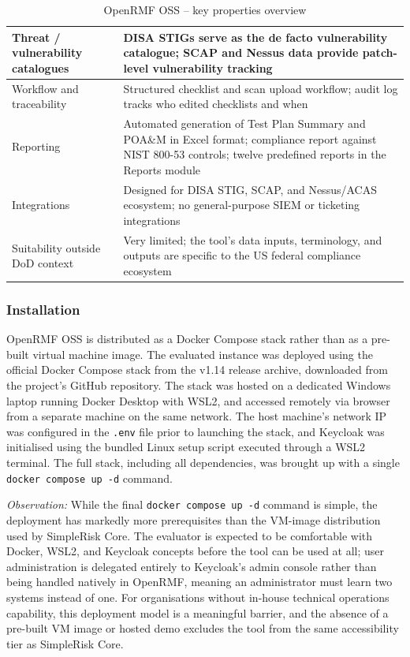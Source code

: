 \begin{table}[H]
\begin{tabular}{|p{4.5cm}|p{9cm}|}
\hline
Threat / vulnerability catalogues & DISA STIGs serve as the de facto vulnerability catalogue; SCAP and Nessus data provide patch-level vulnerability tracking \\
\hline
Workflow and traceability & Structured checklist and scan upload workflow; audit log tracks who edited checklists and when \\
\hline
Reporting & Automated generation of Test Plan Summary and POA\&M in Excel format; compliance report against NIST 800-53 controls; twelve predefined reports in the Reports module \\
\hline
Integrations & Designed for DISA STIG, SCAP, and Nessus/ACAS ecosystem; no general-purpose SIEM or ticketing integrations \\
\hline
Suitability outside DoD context & Very limited; the tool's data inputs, terminology, and outputs are specific to the US federal compliance ecosystem \\
\hline
\end{tabular}
\caption{OpenRMF OSS -- key properties overview}
\label{tab:openrmf-overview}
\end{table}
 
\subsubsection{Installation}

OpenRMF OSS is distributed as a Docker Compose stack rather than as a
pre-built virtual machine image. The evaluated instance was deployed using the
official Docker Compose stack from the v1.14 release archive, downloaded from
the project's GitHub repository. The stack was hosted on a dedicated Windows
laptop running Docker Desktop with WSL2, and accessed remotely via browser
from a separate machine on the same network. The host machine's network IP
was configured in the \texttt{.env} file prior to launching the stack, and
Keycloak was initialised using the bundled Linux setup script executed through
a WSL2 terminal. The full stack, including all dependencies, was brought up
with a single \texttt{docker compose up -d} command.

\textit{Observation:} While the final \texttt{docker compose up -d} command is
simple, the deployment has markedly more prerequisites than the VM-image
distribution used by SimpleRisk Core. The evaluator is expected to be
comfortable with Docker, WSL2, and Keycloak concepts before the tool can be
used at all; user administration is delegated entirely to Keycloak's admin
console rather than being handled natively in OpenRMF, meaning an
administrator must learn two systems instead of one. For organisations
without in-house technical operations capability, this deployment model is a
meaningful barrier, and the absence of a pre-built VM image or hosted demo
excludes the tool from the same accessibility tier as SimpleRisk Core.

